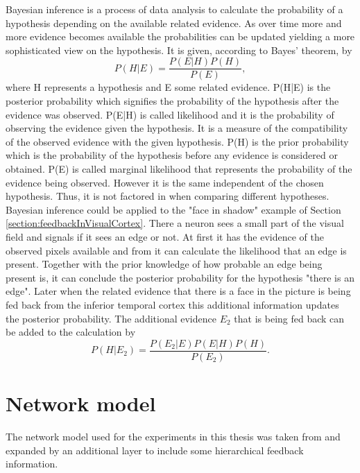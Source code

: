 Bayesian inference is a process of data analysis to calculate the probability of a hypothesis depending on the available related evidence. As over time more and more evidence becomes available the probabilities can be updated yielding a more sophisticated view on the hypothesis. It is given, according to Bayes' theorem, by
\begin{equation}
\label{eqn:bayesianInference}
P(H|E) = \frac{P(E|H)P(H)}{P(E)},
\end{equation}
where H represents a hypothesis and E some related evidence. P(H|E) is the posterior probability which signifies the probability of the hypothesis after the evidence was observed. P(E|H) is called likelihood and it is the probability of observing the evidence 	given the hypothesis. It is a measure of the compatibility of the observed evidence with the given hypothesis. P(H) is the prior probability which is the probability of the hypothesis before any evidence is considered or obtained. P(E) is called marginal likelihood that represents the probability of the evidence being observed. However it is the same independent of the chosen hypothesis. Thus, it is not factored in when comparing different hypotheses.
Bayesian inference could be applied to the "face in shadow" example of Section \ref{section:feedbackInVisualCortex}. There a neuron sees a small part of the visual field and signals if it sees an edge or not. At first it has the evidence of the observed pixels available and from it can calculate the likelihood that an edge is present. Together with the prior knowledge of how probable an edge being present is, it can conclude the posterior probability for the hypothesis "there is an edge". Later when the related evidence that there is a face in the picture is being fed back from the inferior temporal cortex this additional information updates the posterior probability. The additional evidence $E_2$ that is being fed back can be added to the calculation by
\begin{equation}
\label{eqn:bayesianInference}
P(H|E_2) = \frac{P(E_2|E)P(E|H)P(H)}{P(E_2)}.
\end{equation}
\citep{bayesInferenceBook}

\section{Network model}

The network model used for the experiments in this thesis was taken from \citet{nessler} and expanded by an additional layer to include some hierarchical feedback information.

